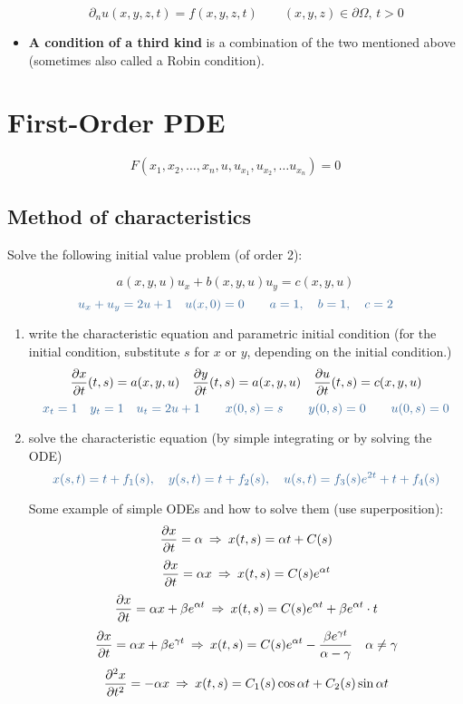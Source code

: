 \documentclass{article}
\begin{document}
\begin{twocolumn}
\begin{itemize}
	$$\partial_n u(x,y,z,t) = f(x,y,z,t) \qquad (x,y,z) \in \partial \Omega, \, t > 0$$
	
	\item \textbf{A condition of a third kind} is a combination of the two mentioned above (sometimes also called a Robin condition).
	
\end{itemize}

\section{First-Order PDE}

$$F(x_1,x_2,\ldots, x_n, u, u_{x_1}, u_{x_2}, \ldots u_{x_n}) = 0$$

\subsection{Method of characteristics}
Solve the following initial value problem (of order 2):

$$a(x,y,u) u_x + b(x,y,u) u_y = c(x,y,u)$$
$$\ex{u_x + u_y = 2u + 1 \quad u(x,0) = 0 \qquad a = 1, \quad b = 1, \quad c = 2}$$

\begin{enumerate}

\item write the characteristic equation and parametric initial condition (for the initial condition, substitute $s$ for $x$ or $y$, depending on the initial condition.)
$$\frac{\partial x}{\partial t}(t,s) = a(x,y,u) \quad \frac{\partial y}{\partial t}(t,s) = a(x,y,u) \quad \frac{\partial u}{\partial t}(t,s) = c(x,y,u)$$
$$\ex{x_t = 1 \quad y_t = 1 \quad u_t = 2u + 1 \qquad x(0,s) = s \qquad y(0,s) = 0 \qquad u(0,s) = 0}$$

\item solve the characteristic equation (by simple integrating or by solving the ODE)
$$\ex{x(s,t) = t + f_1(s), \quad y(s,t) = t + f_2(s), \quad u(s,t) = f_3(s) e^{2t} + t + f_4(s)}$$

Some example of simple ODEs and how to solve them (use superposition):
$$\frac{\partial x}{\partial t} = \alpha \: \Rightarrow \: x(t,s) = \alpha t + C(s)$$
$$\frac{\partial x}{\partial t} = \alpha x \: \Rightarrow \: x(t,s) = C(s) e^{\alpha t}$$
$$\frac{\partial x}{\partial t} = \alpha x + \beta e^{\alpha t} \: \Rightarrow \: x(t,s) = C(s) e^{\alpha t} + \beta e^{\alpha t} \cdot t$$
$$\frac{\partial x}{\partial t} = \alpha x + \beta e^{\gamma t} \: \Rightarrow \: x(t,s) = C(s) e^{\alpha t} - \frac{\beta e^{\gamma t}}{\alpha - \gamma} \quad \alpha \neq \gamma$$
$$\frac{\partial^2 x}{\partial t ^2} = -\alpha x \: \Rightarrow \: x(t,s) = C_1(s) \cos \alpha t + C_2(s) \sin \alpha t$$


\end{enumerate}
\end{twocolumn}
\end{document}
